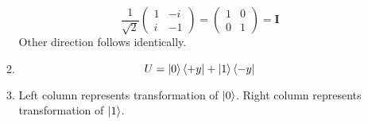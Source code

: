 \documentclass[12pt]{article}
\begin{document}
\begin{enumerate}[font=\bfseries]
\begin{enumerate}
\[                        \frac{1}{\sqrt{2}}\begin{pmatrix}
                        1 & -i \\
                        i & -1
                        \end{pmatrix}
                        =
                        \begin{pmatrix}
                        1 & 0 \\
                        0 & 1
                        \end{pmatrix}
                        = \mathbf{I}
                        \]
                Other direction follows identically.
            \item \[U = \ket{0}\bra{+y} + \ket{1}\bra{-y}\]
            \item Left column represents transformation of $\ket{0}$. Right column represents transformation of $\ket{1}$.
        \end{enumerate}
\end{enumerate}
\end{document}
